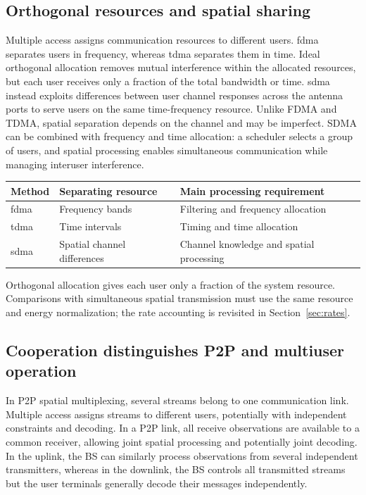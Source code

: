 \subsection{Orthogonal resources and spatial sharing}
Multiple access assigns communication resources to different users. \Ac{fdma} separates users in frequency, whereas \ac{tdma} separates them in time. Ideal orthogonal allocation removes mutual interference within the allocated resources, but each user receives only a fraction of the total bandwidth or time. \Ac{sdma} instead exploits differences between user channel responses across the antenna ports to serve users on the same time-frequency resource. Unlike FDMA and TDMA, spatial separation depends on the channel and may be imperfect. SDMA can be combined with frequency and time allocation: a scheduler selects a group of users, and spatial processing enables simultaneous communication while managing interuser interference.

\begin{center}
	\begin{tabular}{lll}
		\toprule
		Method & Separating resource & Main processing requirement\\
		\midrule
		\acs{fdma} & Frequency bands & Filtering and frequency allocation\\
		\acs{tdma} & Time intervals & Timing and time allocation\\
		\acs{sdma} & Spatial channel differences & Channel knowledge and spatial processing\\
		\bottomrule
	\end{tabular}
\end{center}
Orthogonal allocation gives each user only a fraction of the system resource. Comparisons with simultaneous spatial transmission must use the same resource and energy normalization; the rate accounting is revisited in Section~\ref{sec:rates}.

\subsection{Cooperation distinguishes P2P and multiuser operation}
In P2P spatial multiplexing, several streams belong to one communication link. Multiple access assigns streams to different users, potentially with independent constraints and decoding. In a P2P link, all receive observations are available to a common receiver, allowing joint spatial processing and potentially joint decoding. In the uplink, the BS can similarly process observations from several independent transmitters, whereas in the downlink, the BS controls all transmitted streams but the user terminals generally decode their messages independently.

